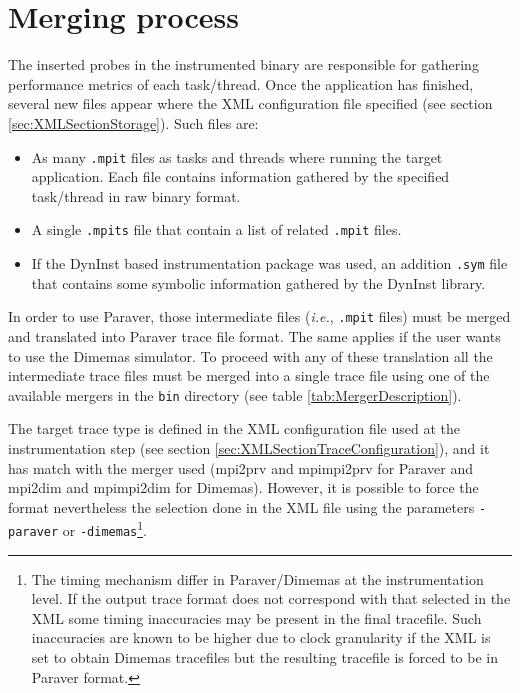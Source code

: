 
\chapter{Merging process}\label{cha:Merging}

The inserted probes in the instrumented binary are responsible for gathering performance metrics of each task/thread. Once the application has finished, several new files appear where the XML configuration file specified (see section \ref{sec:XMLSectionStorage}). Such files are:

\begin{itemize}
 \item As many {\tt .mpit} files as tasks and threads where running the target application. Each file contains information gathered by the specified task/thread in raw binary format.
 \item A single {\tt .mpits} file that contain a list of related {\tt .mpit} files.
 \item If the DynInst based instrumentation package was used, an addition {\tt .sym} file that contains some symbolic information gathered by the DynInst library.
\end{itemize}

In order to use Paraver, those intermediate files ({\it i.e.}, {\tt .mpit} files) must be merged and translated into Paraver trace file format. The same applies if the user wants to use the Dimemas simulator. To proceed with any of these translation all the intermediate trace files must be merged into a single trace file using one of the available mergers in the {\tt bin} directory (see table \ref{tab:MergerDescription}).

The target trace type is defined in the XML configuration file used at the instrumentation step (see section \ref{sec:XMLSectionTraceConfiguration}), and it has match with the merger used (mpi2prv and mpimpi2prv for Paraver and mpi2dim and mpimpi2dim for Dimemas). However, it is possible to force the format nevertheless the selection done in the XML file using the parameters {\tt -paraver} or {\tt -dimemas}\footnote{The timing mechanism differ in Paraver/Dimemas at the instrumentation level. If the output trace format does not correspond with that selected in the XML some timing inaccuracies may be present in the final tracefile. Such inaccuracies are known to be higher due to clock granularity if the XML is set to obtain Dimemas tracefiles but the resulting tracefile is forced to be in Paraver format.}.

